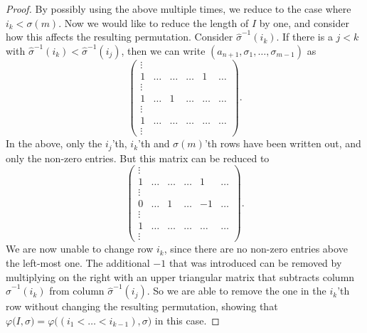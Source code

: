 \begin{proof}
  By possibly using the above multiple times, we reduce to the case
  where $i_k < \sigma(m)$. Now we would like to reduce the length of
  $I$ by one, and consider how this affects the resulting permutation.
  Consider $\widehat\sigma^{-1}(i_k)$. If
  there is a $j < k$ with $\widehat\sigma^{-1}(i_k) <
  \widehat\sigma^{-1}(i_j)$, then we can write
  $(a_{n+1},\sigma_1,\dots,\sigma_{m-1})$ as
  \[
  \begin{pmatrix}
    \vdots & \\
    1 & \dots & \dots & \dots & 1 & \dots\\
    \vdots \\
    1 & \dots & 1 & \dots & \dots & \dots\\
    \vdots & \\
    1 &  \dots & \dots & \dots & \dots & \dots\\
    \vdots
  \end{pmatrix}. \]
  In the above, only the $i_j$'th, $i_k$'th and $\sigma(m)$'th rows
  have been written out, and only the non-zero entries. But this
  matrix can be reduced to
  \[
  \begin{pmatrix}
    \vdots & \\
    1 & \dots & \dots & \dots & 1 & \dots\\
    \vdots \\
    0 & \dots & 1 & \dots & -1 & \dots\\
    \vdots & \\
    1 & \dots & \dots  & \dots & \dots & \dots\\
    \vdots
  \end{pmatrix}. \]
  We are now unable to change row $i_k$, since there are no non-zero
  entries above the left-most one. The additional $-1$ that was
  introduced can be removed by multiplying on the right with an upper
  triangular matrix that subtracts column $\widehat\sigma^{-1}(i_k)$
  from column $\widehat\sigma^{-1}(i_j)$. So we are able to remove the
  one in the $i_k$'th row without changing the resulting permutation,
  showing that $\varphi\big(I,\sigma\big) =
  \varphi\big((i_1<\dots<i_{k-1}),\sigma\big)$ in this case.


\end{proof}
